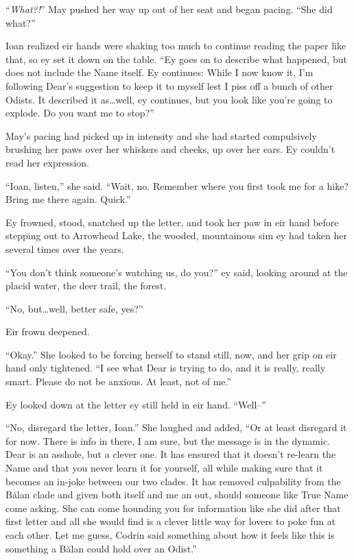 ``\emph{What?!}'' May pushed her way up out of her seat and began pacing. ``She did what?''

Ioan realized eir hands were shaking too much to continue reading the paper like that, so ey set it down on the table. ``Ey goes on to describe what happened, but does not include the Name itself. Ey continues: While I now know it, I'm following Dear's suggestion to keep it to myself lest I piss off a bunch of other Odists. It described it as\ldots well, ey continues, but you look like you're going to explode. Do you want me to stop?''

May's pacing had picked up in intensity and she had started compulsively brushing her paws over her whiskers and cheeks, up over her ears. Ey couldn't read her expression.

``Ioan, listen,'' she said. ``Wait, no. Remember where you first took me for a hike? Bring me there again. Quick.''

Ey frowned, stood, snatched up the letter, and took her paw in eir hand before stepping out to Arrowhead Lake, the wooded, mountainous sim ey had taken her several times over the years.

``You don't think someone's watching us, do you?'' ey said, looking around at the placid water, the deer trail, the forest.

``No, but\ldots well, better safe, yes?''

Eir frown deepened.

``Okay.'' She looked to be forcing herself to stand still, now, and her grip on eir hand only tightened. ``I see what Dear is trying to do, and it is really, really smart. Please do not be anxious. At least, not of me.''

Ey looked down at the letter ey still held in eir hand. ``Well--''

``No, disregard the letter, Ioan.'' She laughed and added, ``Or at least disregard it for now. There is info in there, I am sure, but the message is in the dynamic. Dear is an asshole, but a clever one. It has ensured that it doesn't re-learn the Name and that you never learn it for yourself, all while making sure that it becomes an in-joke between our two clades. It has removed culpability from the Bălan clade and given both itself and me an out, should someone like True Name come asking. She can come hounding you for information like she did after that first letter and all she would find is a clever little way for lovers to poke fun at each other. Let me guess, Codrin said something about how it feels like this is something a Bălan could hold over an Odist.''

